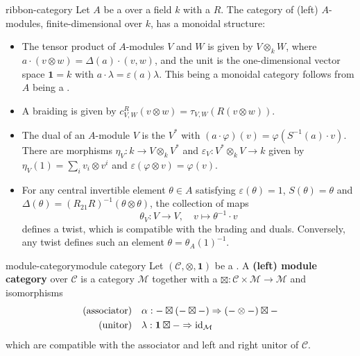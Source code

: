 \begin{example}{ribbon-category}
    Let $A$ be a  over a field $k$ with a  $R$. The category of (left) $A$-modules, finite-dimensional over $k$, has a monoidal structure:
    \begin{itemize}
        \item The tensor product of $A$-modules $V$ and $W$ is given by $V \otimes_k W$, where $a \cdot (v \otimes w) = \Delta(a) \cdot (v, w)$, and the unit is the one-dimensional vector space $\textbf{1} = k$ with $a \cdot \lambda = \varepsilon(a) \lambda$. This being a monoidal category follows from $A$ being a .
        \item A braiding is given by $c_{V, W}^R(v \otimes w) = \tau_{V, W}(R (v \otimes w))$.
        \item The dual of an $A$-module $V$ is the  $V^*$ with $(a \cdot \varphi)(v) = \varphi(S^{-1}(a) \cdot v)$. There are morphisms $\eta_V : k \to V \otimes_k V^*$ and $\varepsilon_V : V^* \otimes_k V \to k$ given by $\eta_V(1) = \sum_i v_i \otimes v^i$ and $\varepsilon(\varphi \otimes v) = \varphi(v)$. 
        \item For any central invertible element $\theta \in A$ satisfying $\varepsilon(\theta) = 1$, $S(\theta) = \theta$ and $\Delta(\theta) = (R_{21} R)^{-1} (\theta \otimes \theta)$, the collection of maps
        \[ \theta_V : V \to V, \quad v \mapsto \theta^{-1} \cdot v \]
        defines a twist, which is compatible with the brading and duals. Conversely, any twist defines such an element $\theta = \theta_A(1)^{-1}$.
    \end{itemize}
\end{example}

\begin{topic}{module-category}{module category}
    Let $(\mathcal{C}, \otimes, \textbf{1})$ be a . A \textbf{(left) module category} over $\mathcal{C}$ is a category $\mathcal{M}$ together with a  $\boxtimes : \mathcal{C} \times \mathcal{M} \to \mathcal{M}$ and  isomorphisms
    \[ \begin{aligned}
        \textup{(associator)}& \quad \alpha : - \boxtimes (- \boxtimes -) \Rightarrow (- \otimes -) \boxtimes - \\
        \textup{(unitor)}& \quad \lambda : \textbf{1} \boxtimes - \Rightarrow \textup{id}_\mathcal{M}
    \end{aligned} \]
    which are compatible with the associator and left and right unitor of $\mathcal{C}$.
\end{topic}

